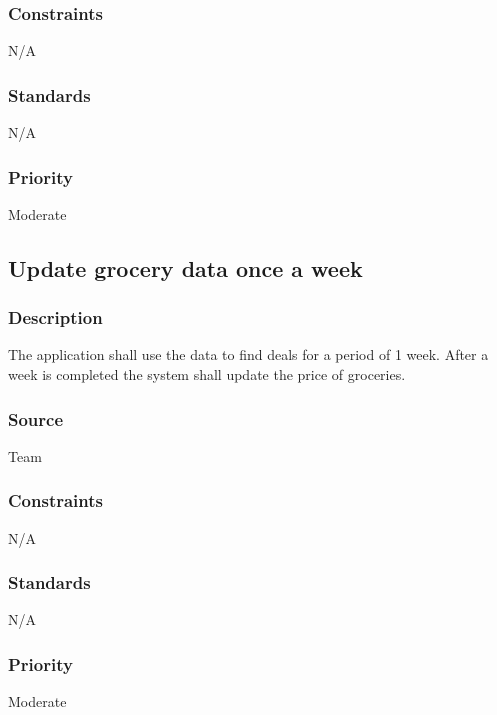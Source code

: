 \subsubsection{Constraints}
N/A
\subsubsection{Standards}
N/A
\subsubsection{Priority}
Moderate
\subsection{Update grocery data once a week}
\subsubsection{Description}
The application shall use the data to find deals for a period of 1 week. After a week is completed the system shall update the price of groceries.  
\subsubsection{Source}
Team
\subsubsection{Constraints}
N/A
\subsubsection{Standards}
N/A
\subsubsection{Priority}
Moderate